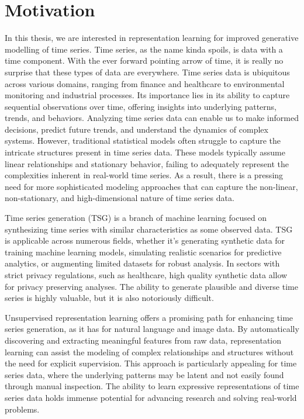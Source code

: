 \documentclass[../../thesis.tex]{subfiles}
\begin{document}
\section{Motivation}
In this thesis, we are interested in representation learning for improved generative modelling of time series. Time series, as the name kinda spoils, is data with a time component. With the ever forward pointing arrow of time, it is really no surprise that these types of data are everywhere. Time series data is ubiquitous across various domains, ranging from finance and healthcare to environmental monitoring and industrial processes. Its importance lies in its ability to capture sequential observations over time, offering insights into underlying patterns, trends, and behaviors. Analyzing time series data can enable us to make informed decisions, predict future trends, and understand the dynamics of complex systems. However, traditional statistical models often struggle to capture the intricate structures present in time series data. These models typically assume linear relationships and stationary behavior, failing to adequately represent the complexities inherent in real-world time series. As a result, there is a pressing need for more sophisticated modeling approaches that can capture the non-linear, non-stationary, and high-dimensional nature of time series data.\newline

Time series generation (TSG) is a branch of machine learning focused on synthesizing time series with similar characteristics as some observed data. TSG is applicable across numerous fields, whether it's generating synthetic data for training machine learning models, simulating realistic scenarios for predictive analytics, or augmenting limited datasets for robust analysis. In sectors with strict privacy regulations, such as healthcare, high quality synthetic data allow for privacy preserving analyses. The ability to generate plausible and diverse time series is highly valuable, but it is also notoriously difficult.\newline

Unsupervised representation learning offers a promising path for enhancing time series generation, as it has for natural language and image data. By automatically discovering and extracting meaningful features from raw data, representation learning can assist the modeling of complex relationships and structures without the need for explicit supervision. This approach is particularly appealing for time series data, where the underlying patterns may be latent and not easily found through manual inspection. The ability to learn expressive representations of time series data holds immense potential for advancing research and solving real-world problems.\newline
\end{document}
